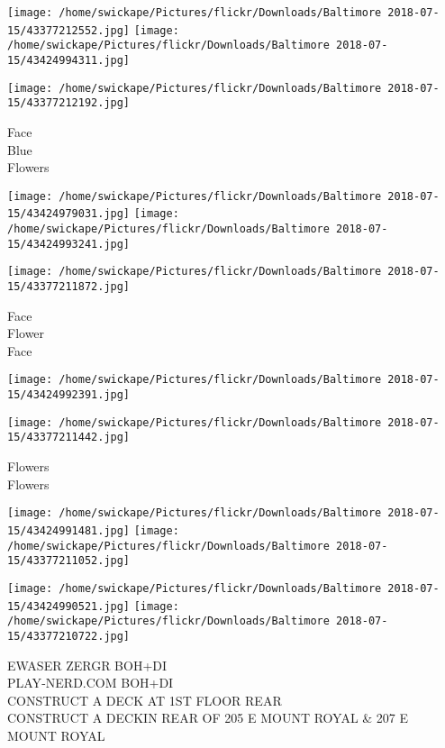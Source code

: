 \documentclass[10pt,letterpaper]{article}
\begin{document}
\texttt{[image: /home/swickape/Pictures/flickr/Downloads/Baltimore 2018-07-15/43377212552.jpg]}
\texttt{[image: /home/swickape/Pictures/flickr/Downloads/Baltimore 2018-07-15/43424994311.jpg]}

\vspace{0.25in}
\texttt{[image: /home/swickape/Pictures/flickr/Downloads/Baltimore 2018-07-15/43377212192.jpg]}

Face\\
Blue\\
Flowers\\
\pagebreak

\texttt{[image: /home/swickape/Pictures/flickr/Downloads/Baltimore 2018-07-15/43424979031.jpg]}
\texttt{[image: /home/swickape/Pictures/flickr/Downloads/Baltimore 2018-07-15/43424993241.jpg]}

\texttt{[image: /home/swickape/Pictures/flickr/Downloads/Baltimore 2018-07-15/43377211872.jpg]}

Face\\
Flower\\
Face\\
\pagebreak

\texttt{[image: /home/swickape/Pictures/flickr/Downloads/Baltimore 2018-07-15/43424992391.jpg]}

\vspace{0.25in}
\texttt{[image: /home/swickape/Pictures/flickr/Downloads/Baltimore 2018-07-15/43377211442.jpg]}

Flowers\\
Flowers\\
\pagebreak

\texttt{[image: /home/swickape/Pictures/flickr/Downloads/Baltimore 2018-07-15/43424991481.jpg]}
\texttt{[image: /home/swickape/Pictures/flickr/Downloads/Baltimore 2018-07-15/43377211052.jpg]}

\texttt{[image: /home/swickape/Pictures/flickr/Downloads/Baltimore 2018-07-15/43424990521.jpg]}
\texttt{[image: /home/swickape/Pictures/flickr/Downloads/Baltimore 2018-07-15/43377210722.jpg]}

EWASER ZERGR BOH+DI\\
PLAY{-}NERD.COM BOH+DI\\
CONSTRUCT A DECK AT 1ST FLOOR REAR\\
CONSTRUCT A DECKIN REAR OF 205 E MOUNT ROYAL \& 207 E MOUNT ROYAL\\
\pagebreak
\end{document}
